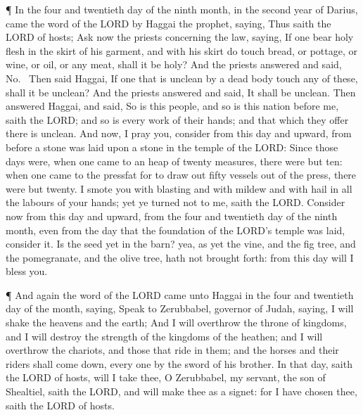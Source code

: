  ¶ In the four and twentieth day of the ninth month, in the
second year of Darius, came the word of the LORD by Haggai the prophet,
saying,  Thus saith the LORD of hosts; Ask now the priests
concerning the law, saying,  If one bear holy flesh in the
skirt of his garment, and with his skirt do touch bread, or pottage, or
wine, or oil, or any meat, shall it be holy? And the priests answered
and said, No.~ Then said Haggai, If one that is unclean by
a dead body touch any of these, shall it be unclean? And the priests
answered and said, It shall be unclean.  Then answered
Haggai, and said, So is this people, and so is this nation before me,
saith the LORD; and so is every work of their hands; and that which they
offer there is unclean.  And now, I pray you, consider from
this day and upward, from before a stone was laid upon a stone in the
temple of the LORD:  Since those days were, when one came
to an heap of twenty measures, there were but ten: when one came to the
pressfat for to draw out fifty vessels out of the press, there were but
twenty.  I smote you with blasting and with mildew and with
hail in all the labours of your hands; yet ye turned not to me, saith
the LORD.  Consider now from this day and upward, from the
four and twentieth day of the ninth month, even from the day that the
foundation of the LORD's temple was laid, consider it.  Is
the seed yet in the barn? yea, as yet the vine, and the fig tree, and
the pomegranate, and the olive tree, hath not brought forth: from this
day will I bless you.

 ¶ And again the word of the LORD came unto Haggai in the
four and twentieth day of the month, saying,  Speak to
Zerubbabel, governor of Judah, saying, I will shake the heavens and the
earth;  And I will overthrow the throne of kingdoms, and I
will destroy the strength of the kingdoms of the heathen; and I will
overthrow the chariots, and those that ride in them; and the horses and
their riders shall come down, every one by the sword of his brother.
 In that day, saith the LORD of hosts, will I take thee, O
Zerubbabel, my servant, the son of Shealtiel, saith the LORD, and will
make thee as a signet: for I have chosen thee, saith the LORD of hosts.
